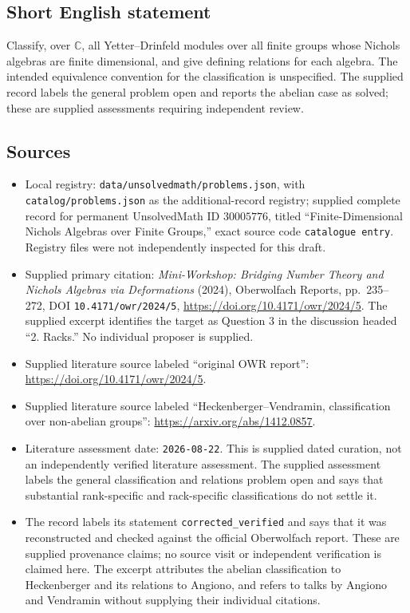 \documentclass[11pt]{article}
\newcommand{\C}{\mathbb{C}}
\begin{document}
\subsection{Short English statement}
Classify, over \(\C\), all Yetter--Drinfeld modules over all finite groups whose Nichols algebras are finite dimensional, and give defining relations for each algebra. The intended equivalence convention for the classification is unspecified. The supplied record labels the general problem open and reports the abelian case as solved; these are supplied assessments requiring independent review.
\subsection{Sources}
\begin{itemize}
\item Local registry: \texttt{data/unsolvedmath/problems.json}, with \texttt{catalog/problems.json} as the additional-record registry; supplied complete record for permanent UnsolvedMath ID \(30005776\), titled ``Finite-Dimensional Nichols Algebras over Finite Groups,'' exact source code \texttt{catalogue entry}. Registry files were not independently inspected for this draft.
\item Supplied primary citation: \emph{Mini-Workshop: Bridging Number Theory and Nichols Algebras via Deformations} (2024), Oberwolfach Reports, pp.\ 235--272, DOI \texttt{10.4171/owr/2024/5}, \url{https://doi.org/10.4171/owr/2024/5}. The supplied excerpt identifies the target as Question 3 in the discussion headed ``2. Racks.'' No individual proposer is supplied.
\item Supplied literature source labeled ``original OWR report'': \url{https://doi.org/10.4171/owr/2024/5}.
\item Supplied literature source labeled ``Heckenberger--Vendramin, classification over non-abelian groups'': \url{https://arxiv.org/abs/1412.0857}.
\item Literature assessment date: \texttt{2026-08-22}. This is supplied dated curation, not an independently verified literature assessment. The supplied assessment labels the general classification and relations problem open and says that substantial rank-specific and rack-specific classifications do not settle it.
\item The record labels its statement \texttt{corrected\_verified} and says that it was reconstructed and checked against the official Oberwolfach report. These are supplied provenance claims; no source visit or independent verification is claimed here. The excerpt attributes the abelian classification to Heckenberger and its relations to Angiono, and refers to talks by Angiono and Vendramin without supplying their individual citations.
\end{itemize}
\end{document}
